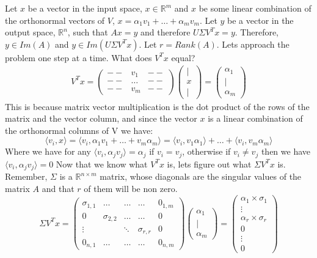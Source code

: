 \documentclass[12pt,twoside]{article}
\newcommand{\R}{\mathbb{R}}
\begin{document}
Let $x$ be a vector in the input space, $x\in \R^m$ and $x$ be some linear combination of the orthonormal vectors of $V$, $x=\alpha_1v_1 + \dots + \alpha_m v_m$. Let $y$ be a vector in the output space, $\R^n$, such that $Ax=y$ and therefore $U\Sigma V^Tx = y$. Therefore, $y\in Im(A)$ and $y\in Im(U\Sigma V^Tx)$. Let $r=Rank(A)$.
Lets approach the problem one step at a time. What does $V^Tx$ equal?
\begin{equation}
    \begin{split}
        V^Tx = \begin{pmatrix}
					-- & v_1 & -- \\
					-- & \dots & -- \\
					-- & v_m & --  
			\end{pmatrix}\begin{pmatrix}
			| \\
					x \\
					|
			\end{pmatrix} = \begin{pmatrix}
			\alpha_1 \\
			| \\
			\alpha_m
			\end{pmatrix}
    \end{split}
\end{equation}
This is because matrix vector multiplication is the dot product of the rows of the matrix and the vector column, and since the vector $x$ is a linear combination of the orthonormal columns of V we have:
$$
    \langle v_i, x \rangle = \langle v_i, \alpha_1 v_1 + \dots + v_m\alpha_m \rangle = \langle v_i, v_1\alpha_1 \rangle + \dots + \langle v_i, v_m\alpha_m \rangle $$
Where we have for any $\langle v_i, \alpha_jv_j \rangle = \alpha_j$ if $v_i=v_j$, otherwise if $v_i \neq v_j$ then we have $\langle v_i, \alpha_jv_j \rangle =0$
Now that we know what $V^Tx$ is, lets figure out what $\Sigma V^Tx$ is. Remember, $\Sigma$ is a $\R^{n\times m}$ matrix, whose diagonals are the singular values of the matrix $A$ and that $r$ of them will be non zero.
$$
    \Sigma V^Tx = \begin{pmatrix}
    \sigma_{1,1} & \dots & \dots & \dots & 0_{1,m}\\
    0 & \sigma_{2,2} & \dots & \dots & 0 \\
    \vdots & & \ddots & \sigma_{r,r} & 0\\
    0_{n,1} & \dots & \dots & \dots & 0_{n,m}
    \end{pmatrix} \begin{pmatrix}
			\alpha_1 \\
			| \\
			\alpha_m
			\end{pmatrix} = 
			\begin{pmatrix}
			\alpha_1 \times \sigma_1 \\
			\vdots \\
			\alpha_r \times \sigma_r \\
			0 \\
			\vdots \\
			0
			\end{pmatrix}
$$
\end{document}
